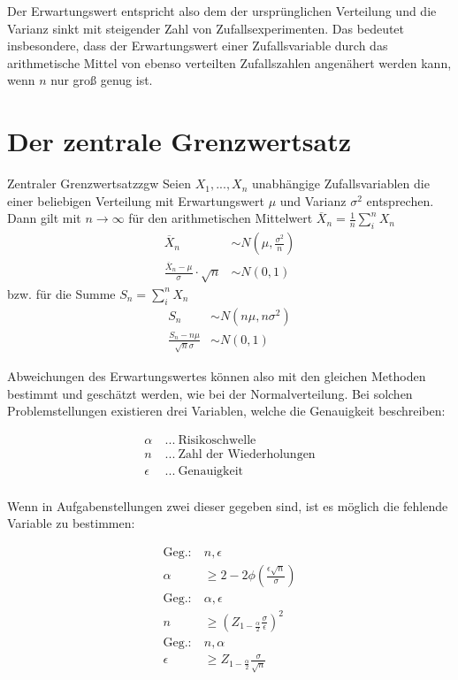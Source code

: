 Der Erwartungswert entspricht also dem der ursprünglichen Verteilung und die Varianz sinkt mit steigender Zahl von Zufallsexperimenten.
Das bedeutet insbesondere, dass der Erwartungswert einer Zufallsvariable durch das arithmetische Mittel von ebenso verteilten Zufallszahlen angenähert werden kann, wenn $n$ nur groß genug ist.

\section{Der zentrale Grenzwertsatz}

\begin{theorem}{Zentraler Grenzwertsatz}{zgw}
Seien $X_1, ..., X_n$ unabhängige Zufallsvariablen die einer beliebigen
Verteilung mit Erwartungswert $\mu$ und Varianz $\sigma^2$ entsprechen. Dann
gilt mit $n\to\infty$ für den arithmetischen Mittelwert
$\overline{X}_n = \frac{1}{n}\sum_i^n X_n$
\begin{align*}
\overline{X}_n &\sim N(\mu, \frac{\sigma^2}{n}) \\
\frac{\overline{X}_n -\mu}{\sigma} \cdot \sqrt{n} &\sim N(0,1)
\end{align*}
bzw. für die Summe $S_n = \sum_i^n X_n$
\begin{align*}
S_n &\sim N(n\mu, n\sigma^2) \\
\frac{S_n -n\mu}{\sqrt{n}\sigma} &\sim N(0,1)
\end{align*}
\end{theorem}

Abweichungen des Erwartungswertes können also mit den gleichen Methoden bestimmt und geschätzt werden, wie bei der Normalverteilung.
Bei solchen Problemstellungen existieren drei Variablen, welche die Genauigkeit beschreiben:

\begin{align*}
  \alpha&\: ...\: \text{Risikoschwelle}\\
  n&\: ...\: \text{Zahl der Wiederholungen}\\
  \epsilon&\: ...\: \text{Genauigkeit}\\
\end{align*}

Wenn in Aufgabenstellungen zwei dieser gegeben sind, ist es möglich die fehlende Variable zu bestimmen:

\begin{align*}
  \text{Geg.:} \:  &n, \epsilon\\
  \alpha &\ge 2-2\phi\left(\frac{\epsilon\sqrt{n}}{\sigma}\right)\\
  \text{Geg.:} \:  &\alpha, \epsilon\\
  n &\ge \left(Z_{1-\frac{\alpha}{2}}\frac{\sigma}{\epsilon}\right)^2\\
  \text{Geg.:} \:  &n, \alpha\\
  \epsilon &\ge Z_{1-\frac{\alpha}{2}}\frac{\sigma}{\sqrt{n}}\\
\end{align*}

